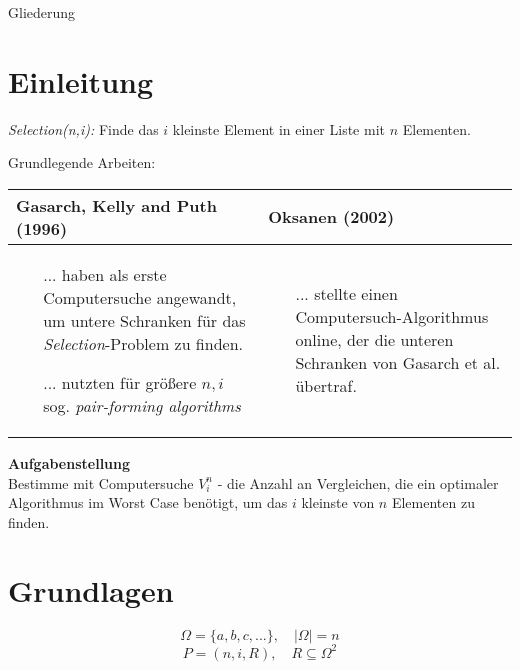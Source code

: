 
\begin{frame}{Gliederung}
  \tableofcontents[hideallsubsections]
\end{frame}


\section{Einleitung}
\begin{frame}{\insertsection}
  \textit{Selection(n,i):} Finde das $i$ kleinste Element in einer Liste mit $n$ Elementen.

  \vspace{5mm}
  Grundlegende Arbeiten:

  \vspace{2mm}
  \begin{tabular}{|p{6cm}|p{6cm}|}
    \hline
    Gasarch, Kelly and Puth (1996)                                                                                        & Oksanen (2002) \\
    \hline
    \raggedright \begin{itemize}
                   \item [...]haben als erste Computersuche angewandt, um untere Schranken für das \textit{Selection}-Problem zu finden.
                   \item [...]nutzten für größere $n,i$ sog. \textit{pair-forming algorithms}
                 \end{itemize} &
    \begin{itemize}
      \item[...] stellte einen Computersuch-Algorithmus online, der die unteren Schranken von Gasarch et al. übertraf.
    \end{itemize}
  \end{tabular}
\end{frame}

\begin{frame}{\insertsection}
  \textbf{Aufgabenstellung} \\
  \vspace{5mm}
  Bestimme mit Computersuche $V_i^n$ - die Anzahl an Vergleichen, die ein optimaler Algorithmus im Worst Case benötigt, um das $i$ kleinste von $n$ Elementen zu finden.

\end{frame}


\section{Grundlagen}
\sectionframe{\insertsection}
\begin{frame}{\insertsection}
  $$ \Omega = \{ a,b,c,...\}, \quad |\Omega| = n $$
  $$P = (n,i,R), \quad R \subseteq \Omega^2$$
\end{frame}


